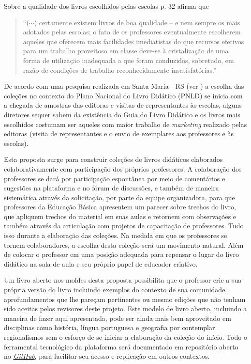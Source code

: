 \documentclass[10 pt]{article}
\begin{document}
Sobre a qualidade dos livros escolhidos pelas escolas \cite{machado} p. 32 afirma que
\blockquote{``($\cdots$) certamente existem livros de boa qualidade -- e nem sempre os mais adotados pelas escolas; o fato de os professores eventualmente escolherem aqueles que oferecem mais facilidades imediatistas do que recursos efetivos para um trabalho proveitoso em classe deve-se à cristalização de uma forma de utilização inadequada a que foram conduzidos, sobretudo, em razão de condições de trabalho reconhecidamente insatisfatórias.''}

De acordo com uma pesquisa realizada em Santa Maria - RS (ver \cite{zambon}) a escolha das coleções no contexto do Plano Nacional do Livro Didático (PNLD) se inicia com a chegada de amostras das editoras e visitas de representantes às escolas, alguns diretores sequer sabem da existência do Guia do Livro Didático e os livros mais escolhidos costumam ser aqueles com maior trabalho de {\it marketing} realizado pelas editoras (visita de representantes e o envio de exemplares aos professores e às escolas).

Esta proposta surge para construir coleções de livros didáticos elaborados colaborativamente com participação dos próprios professores.
A colaboração dos professores se dará por participação espontânea por meio de comentários e sugestões na plataforma e no fórum de discussões, e também de maneira sistemática através da solicitação, por parte da equipe organizadora, para que professores da Educação Básica apresentem um parecer sobre trechos do livro, que apliquem trechos do material em suas aulas e retornem com observações e também através da articulação com projetos de capacitação de professores.
Tudo isso durante a elaboração das coleções.
Na medida em que os professores se tornem colaboradores, a escolha desta coleção será um movimento natural.
Além de colocar o professor em uma posição adequada para repensar o lugar do livro didático na sala de aula e seu próprio papel de educador criativo.

Um livro aberto nos moldes desta proposta possibilita que o professor crie a sua própria versão do livro incluindo exemplos do contexto de sua comunidade, aprofundamentos que lhe pareçam pertinentes ou mesmo edições que não tenham sido aceitas pelos revisores deste projeto.
Este modelo de livro aberto, incluindo a maneira de fazer aqui apresentada, pode ser ainda mais bem aproveitado em disciplinas como história, língua portuguesa e geografia por contemplar regionalismos sem o esforço de se iniciar a elaboração da coleção do início.
Todo o ferramental tecnológico da plataforma será documentado em repositório aberto no {\it \href{https://github.com/livro-aberto}{GitHub}}, para facilitar seu acesso e replicação em outros contextos.
\end{document}
